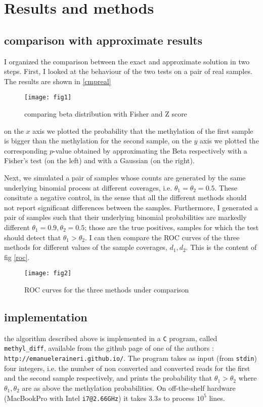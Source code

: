 \documentclass[11pt]{amsart}
\begin{document}
\section{Results and methods} 
\subsection{comparison with approximate results}
I organized the comparison between the exact and approximate solution in two steps. First,
I looked at the behaviour of the two tests on a pair of real samples. The results are shown in \ref{cmpreal}
\begin{figure}[h]
\caption{comparing beta distribution with Fisher and Z score}
\texttt{[image: fig1]}
\end{figure}\label{cmpreal}
on the $x$ axis we plotted the probability that the methylation of the first sample is bigger than the methylation for the second sample, on the $y$ axis we plotted the corresponding $p$-value obtained by approximating the Beta respectively with a Fisher's test (on the left) and with a Gaussian (on the right).

Next, we simulated a pair of samples whose counts are generated by the same underlying binomial process at different coverages, i.e. $\theta_1=\theta_2=0.5$. These consitute a negative control, in the sense that all the different methods should not report significant differences between the samples. Furthermore, I generated a pair of samples such that their underlying binomial probabilities are markedly different $\theta_1=0.9,\theta_2=0.5$; those are the true positives, samples for which the test should detect that $\theta_1>\theta_2$. I can then compare the ROC curves of the three methods for different values of the sample coverages, $d_1,d_2$. 
This is the content of fig \ref{roc}.
\begin{figure}[h]
\caption{ROC curves for the three methods under comparison}
\texttt{[image: fig2]}
\end{figure}\label{roc}
\subsection{implementation}
the algorithm described above is implemented in a \verb=C= program, called \verb=methyl_diff=, available from the github page of one of the authors : \verb=http://emanueleraineri.github.io/=. The program takes as input (from \verb=stdin=) four integers, i.e. the number of non converted and converted reads for the first and the second sample respectively, and prints the probability that $\theta_1>\theta_2$ where $\theta_1,\theta_2$ are as above the methylation probabilities. On off-the-shelf hardware (MacBookPro with Intel \verb=i7@2.66GHz=) it takes $3.3s$ to process $10^5$ lines.
\end{document}
